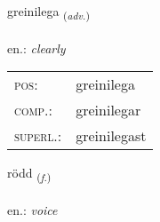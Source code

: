\documentclass[frontgrid, backgrid]{flacards}\usepackage[]{graphicx}\usepackage[]{xcolor}
\begin{document}
\renewcommand{\flhead}{\vskip5pt \fboxsep=0pt {\small\bfseries\footnotesize Atviksorð | Adverb}}
\renewcommand{\fcfoot}{\vskip5pt \fboxsep=0pt \hspace{2pt}{\small\bfseries\footnotesize 2K}}

\renewcommand{\blhead}{\vskip5pt {\small\bfseries\footnotesize Atviksorð | Adverb }}
\renewcommand{\bcfoot}{\vskip5pt \hspace{2pt}{\small\bfseries\footnotesize 2K}}


{greinilega \small{\textsubscript{(\textit{adv.})}} \\[1ex] %
\textphonetic{[kreiːnɪlɛɣa]} \\
en.: \emph{clearly} \\  [2ex]
\renewcommand*{\arraystretch}{0.8}
\begin{tabular}{ll}
\textsc{pos}: & greinilega \\ 
\textsc{comp.}: & greinilegar \\ 
\textsc{superl.}: & greinilegast \\
\end{tabular}
}

\renewcommand{\flhead}{\vskip5pt \fboxsep=0pt {\small\bfseries\footnotesize Nafnorð | Noun}}
\renewcommand{\fcfoot}{\vskip5pt \fboxsep=0pt \hspace{2pt}{\small\bfseries\footnotesize 2K}}

\renewcommand{\blhead}{\vskip5pt {\small\bfseries\footnotesize Nafnorð | Noun }}
\renewcommand{\bcfoot}{\vskip5pt \hspace{2pt}{\small\bfseries\footnotesize 2K}}


{rödd \small{\textsubscript{(\textit{f.})}} \\[1ex] %
\textphonetic{[rœt]} \\
en.: \emph{voice} \\  [2ex]
\renewcommand*{\arraystretch}{0.8}
}
\end{document}
